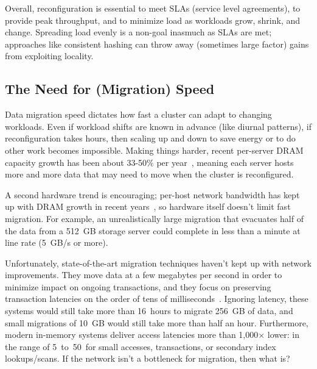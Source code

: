 Overall, reconfiguration is essential to meet SLAs (service level agreements), to provide peak throughput,
and to minimize load as workloads grow, shrink, and change. Spreading load
evenly is a non-goal inasmuch as SLAs are met; approaches like consistent
hashing can throw away (sometimes large factor) gains from exploiting locality.

\subsection{The Need for (Migration) Speed}

Data migration speed dictates how fast a cluster can adapt to changing
workloads.  Even if workload shifts are known in advance (like
diurnal patterns), if reconfiguration takes hours, then scaling up and down to
save energy or to do other work becomes impossible.  Making
things harder, recent per-server DRAM capacity growth has been about 33-50\%
per year~\cite{computer-architecture}, meaning each server hosts more and more
data that may need to move when the cluster is reconfigured.


A second hardware trend is encouraging; per-host network bandwidth has kept up
with DRAM growth in recent years~\cite{ethernet}, so hardware
itself doesn't limit fast migration.  For example, an unrealistically large
migration that evacuates half of the data from a 512~GB storage server could
complete in less than a minute at line rate (5~GB/s or more).


Unfortunately, state-of-the-art migration techniques haven't kept up
with network improvements. They move data at a few megabytes per second in
order to minimize impact on ongoing transactions, and they focus on preserving
transaction latencies on the order of tens of milliseconds~\cite{squall}.
Ignoring latency, these systems would still take more than 16~hours to
migrate 256~GB of data, and small migrations of 10~GB would still take
more than half an hour. Furthermore, modern in-memory systems deliver access
latencies more than 1,000$\times$ lower: in the range of 5~to~50~\us for small
accesses, transactions, or secondary index lookups/scans. If the network isn't a
bottleneck for migration, then what is?

